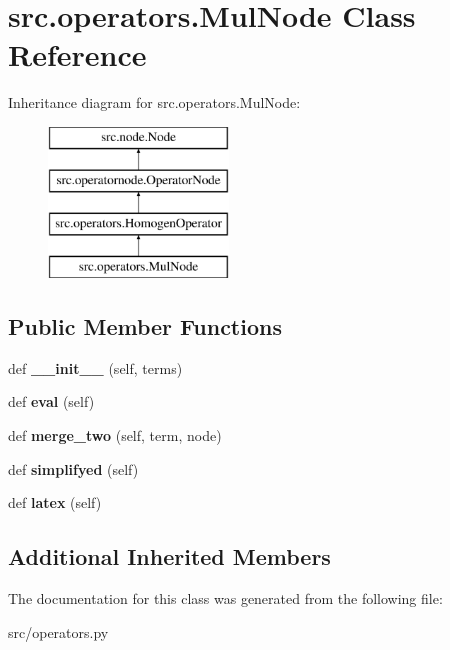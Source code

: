 \hypertarget{classsrc_1_1operators_1_1MulNode}{}\section{src.\+operators.\+Mul\+Node Class Reference}
\label{classsrc_1_1operators_1_1MulNode}
Inheritance diagram for src.\+operators.\+Mul\+Node\+:\begin{figure}[H]
\begin{center}
\leavevmode
\includegraphics[height=4.000000cm]{classsrc_1_1operators_1_1MulNode}
\end{center}
\end{figure}
\subsection*{Public Member Functions}
\begin{DoxyCompactItemize}
\item 
\mbox{\label{classsrc_1_1operators_1_1MulNode_a1ffc386bdbe2f295ce738a52bb518c02}} 
def {\bfseries \+\_\+\+\_\+init\+\_\+\+\_\+} (self, terms)
\item 
\mbox{\label{classsrc_1_1operators_1_1MulNode_a0f9630eb9a8431236eff6c33744e1ed2}} 
def {\bfseries eval} (self)
\item 
\mbox{\label{classsrc_1_1operators_1_1MulNode_ad8b67ebaeb713e18348a86495496b509}} 
def {\bfseries merge\+\_\+two} (self, term, node)
\item 
\mbox{\label{classsrc_1_1operators_1_1MulNode_aa5438e735309074305027f6aed89ae3a}} 
def {\bfseries simplifyed} (self)
\item 
\mbox{\label{classsrc_1_1operators_1_1MulNode_ab7b8c4c9c2af8aa24217ea7ae3534866}} 
def {\bfseries latex} (self)
\end{DoxyCompactItemize}
\subsection*{Additional Inherited Members}


The documentation for this class was generated from the following file\+:\begin{DoxyCompactItemize}
\item 
src/operators.\+py\end{DoxyCompactItemize}
